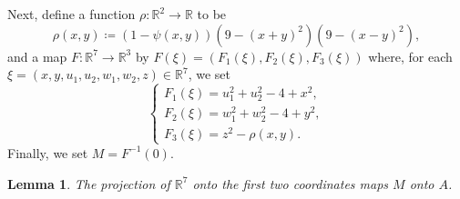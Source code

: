 \documentclass[11pt,reqno]{amsart}
\theoremstyle{plain}
\newtheorem{lemma}[theorem]{Lemma}
\theoremstyle{definition}
\theoremstyle{remark}
\theoremstyle{plain}
\numberwithin{equation}{section}
\newcommand{\R}{\mathbb{R}}
\begin{document}
							Next, define a function $\rho\colon \R^{2}\to \R$ to be $$\rho(x,y)\coloneqq (1-\psi(x,y)) (9-(x+y)^{2})(9-(x-y)^{2}),$$ and a map $F\colon \R^{7}\to \R^{3}$ by $F(\xi)=(F_{1}(\xi),F_{2}(\xi),F_{3}(\xi))$ where, for each $\xi=(x,y,u_{1},u_{2},w_{1},w_{2},z)\in \R^{7}$, we set
							$$\begin{cases}
								F_{1}(\xi)=u_{1}^{2}+u_{2}^{2}-4+x^{2},\\
								F_{2}(\xi)=w_{1}^{2}+w_{2}^{2}-4+y^{2},\\
								F_{3}(\xi)=z^{2}-\rho(x,y).
							\end{cases}$$ Finally, we set $M=F^{-1}(0)$. 
							
							\begin{lemma} \label{lemma: M see projeta sobre A versao psi}
								The projection of $\R^{7}$ onto the first two coordinates maps $M$ onto $A$.
							\end{lemma}
\end{document}
